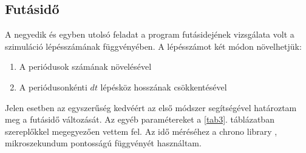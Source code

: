 \begin{multicols}{2}
\subsection{Futásidő}
A negyedik és egyben utolsó feladat a program futásidejének vizsgálata volt a szimuláció lépésszámának függvényében. A lépésszámot két módon növelhetjük:

\begin{enumerate}
    \item A periódusok számának növelésével
    \item A periódusonkénti $dt$ lépésköz hosszának csökkentésével
\end{enumerate}
Jelen esetben az egyszerűség kedvéért az első módszer segítségével határoztam meg a futásidő változását. Az egyéb paramétereket a \ref{tab3}. táblázatban szereplőkkel megegyezően vettem fel. Az idő méréséhez a chrono library  , mikroszekundum pontosságú függvényét használtam.

\end{multicols}
\hrulefill